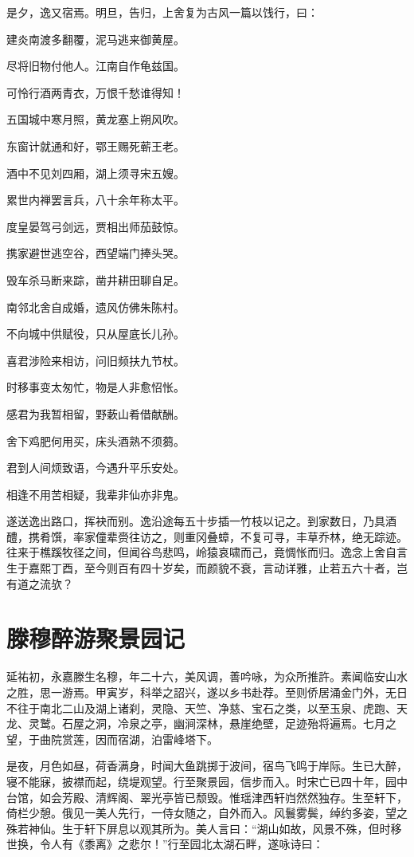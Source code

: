 \documentclass[a4paper,12pt,UTF8,twoside]{ctexbook}
\begin{document}
是夕，逸又宿焉。明旦，告归，上舍复为古风一篇以饯行，曰：

建炎南渡多翻覆，泥马逃来御黄屋。

尽将旧物付他人。江南自作龟兹国。

可怜行酒两青衣，万恨千愁谁得知！

五国城中寒月照，黄龙塞上朔风吹。

东窗计就通和好，鄂王赐死蕲王老。

酒中不见刘四厢，湖上须寻宋五嫂。

累世内禅罢言兵，八十余年称太平。

度皇晏驾弓剑远，贾相出师茄鼓惊。

携家避世逃空谷，西望端门捧头哭。

毁车杀马断来踪，凿井耕田聊自足。

南邻北舍自成婚，遗风仿佛朱陈村。

不向城中供赋役，只从屋底长儿孙。

喜君涉险来相访，问旧频扶九节杖。

时移事变太匆忙，物是人非愈怊怅。

感君为我暂相留，野蔌山肴借献酬。

舍下鸡肥何用买，床头酒熟不须蒭。

君到人间烦致语，今遇升平乐安处。

相逢不用苦相疑，我辈非仙亦非鬼。

遂送逸出路口，挥袂而别。逸沿途每五十步插一竹枝以记之。到家数日，乃具酒醴，携肴馔，率家僮辈赍往访之，则重冈叠蟑，不复可寻，丰草乔林，绝无踪迹。往来于樵蹊牧径之间，但闻谷鸟悲鸣，岭猿哀啸而己，竟惆怅而归。逸念上舍自言生于嘉熙丁酉，至今则百有四十岁矣，而颜貌不衰，言动详雅，止若五六十者，岂有道之流欤？

\chapter{滕穆醉游聚景园记}

延祐初，永嘉滕生名穆，年二十六，美风调，善吟咏，为众所推許。素闻临安山水之胜，思一游焉。甲寅岁，科举之詔兴，遂以乡书赴荐。至则侨居涌金门外，无日不往于南北二山及湖上诸刹，灵隐、天竺、净慈、宝石之类，以至玉泉、虎跑、天龙、灵鹫。石屋之洞，冷泉之亭，幽涧深林，悬崖绝壁，足迹殆将遍焉。七月之望，于曲院赏莲，因而宿湖，泊雷峰塔下。

是夜，月色如昼，荷香满身，时闻大鱼跳掷于波间，宿鸟飞鸣于岸际。生已大醉，寝不能寐，披襟而起，绕堤观望。行至聚景园，信步而入。时宋亡已四十年，园中台馆，如会芳殿、清辉阁、翠光亭皆已颓毁。惟瑶津西轩岿然然独存。生至轩下，倚栏少憩。俄见一美人先行，一侍女随之，自外而入。风鬟雾鬓，绰约多姿，望之殊若神仙。生于轩下屏息以观其所为。美人言曰：“湖山如故，风景不殊，但时移世换，令人有《黍离》之悲尔！”行至园北太湖石畔，遂咏诗曰：
\end{document}
